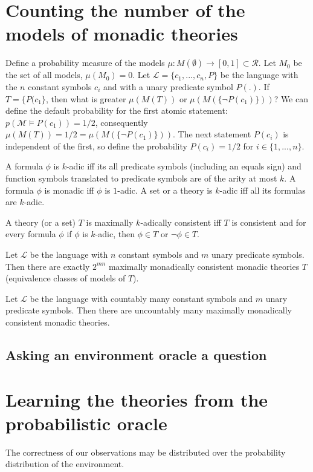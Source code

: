 \section{Counting the number of the models of monadic theories}
Define a probability measure of the models $\mu:M(\emptyset) \to [0,1] \subset \mathcal{R}$. Let $M_0$ be the set of all models, $\mu(M_0)=0$. Let $\mathcal{L}=\{c_1, ..., c_n, P\}$ be the language with the $n$ constant symbols $c_i$ and with a unary predicate symbol $P(.)$. If $T=\{P(c_1\}$, then what is greater $\mu(M(T))$ or $\mu(M(\{\neg P(c_1)\}))$? We can define the default probability for the first atomic statement: $p(\mathcal{M} \models P(c_1))=1/2$, consequently $\mu(M(T))=1/2=\mu(M(\{\neg P(c_1)\}))$. The next statement $P(c_i)$ is independent of the first, so define the probability $P(c_i)=1/2$ for $i \in \{1, ..., n\}$.
\begin{defn}
A formula $\phi$ is $k$-adic iff its all predicate symbols (including an equals sign) and function symbols translated to predicate symbols are of the arity at most $k$. A formula $\phi$ is monadic iff $\phi$ is $1$-adic. A set or a theory is $k$-adic iff all its formulas are $k$-adic.
\end{defn}
\begin{defn}
A theory (or a set) $T$ is maximally $k$-adically consistent iff $T$ is consistent and for every formula $\phi$ if $\phi$ is $k$-adic, then $\phi \in T$ or $\neg \phi \in T$.
\end{defn}
\begin{remark}
Let $\mathcal{L}$ be the language with $n$ constant symbols and $m$ unary predicate symbols. Then there are exactly $2^{mn}$ maximally monadically consistent monadic theories $T$ (equivalence classes of models of $T$).
\end{remark}
\begin{remark}
Let $\mathcal{L}$ be the language with countably many constant symbols and $m$ unary predicate symbols. Then there are uncountably many maximally monadically consistent monadic theories.
\end{remark}
\subsection{Asking an environment oracle a question}
\subsection{}
\section{Learning the theories from the probabilistic oracle}
The correctness of our observations may be distributed over the probability distribution of the environment.
